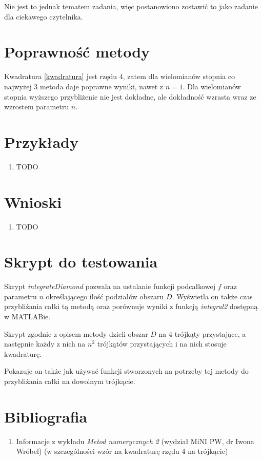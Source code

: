 \documentclass[12pt]{article}
\begin{document}
	Nie jest to jednak tematem zadania, więc postanowiono zostawić to jako zadanie dla ciekawego czytelnika.
	
	
	
	
	\section{Poprawność metody}
	Kwadratura \eqref{kwadratura} jest rzędu 4, zatem dla wielomianów stopnia co najwyżej 3 metoda daje poprawne wyniki, nawet z $n = 1$. Dla wielomianów stopnia wyższego przybliżenie nie jest dokładne, ale dokładność wzrasta wraz ze wzrostem parametru $n$.
	
	
	
	
	\section{Przykłady}
	\begin{enumerate}[label=\textbf{Przykład \arabic*}]
		\item
		TODO
		
	\end{enumerate}
	
	
	
	
	
	
	\section{Wnioski}
	\begin{enumerate}
		\item TODO
	\end{enumerate}

	
	
	
	
	
	\section{Skrypt do testowania}
	Skrypt \textit{integrateDiamond} pozwala na ustalanie funkcji podcałkowej $f$ oraz parametru $n$ określającego ilość podziałów obszaru $D$. Wyświetla on także czas przybliżania całki tą metodą oraz porównuje wyniki z funkcją \textit{integral2} dostępną w MATLABie.
	
	Skrypt zgodnie z opisem metody dzieli obszar $D$ na 4 trójkąty przystające, a następnie każdy z nich na $n^2$ trójkątów przystających i na nich stosuje kwadraturę.
	
	Pokazuje on także jak używać funkcji stworzonych na potrzeby tej metody do przybliżania całki na dowolnym trójkącie.
	
	
	
	
	
	\section{Bibliografia}
	\begin{enumerate}
		\item Informacje z wykładu \textit{Metod numerycznych 2} (wydział MiNI PW, dr Iwona Wróbel) (w szczególności wzór na kwadraturę rzędu 4 na trójkącie)
	\end{enumerate}
	
\end{document}
